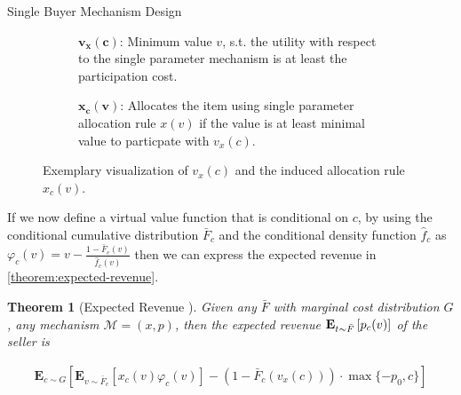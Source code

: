\documentclass[11pt,a4paper]{article}
\newtheorem{theorem}{Theorem}
\newcommand{\Ex}[2][]{\mbox{\rm\bf E}_{#1}\left[#2\right]}
\newcommand{\1}[1]{\mbox{\rm\bf 1}_{#1}}
\begin{document}
\begin{section}{Single Buyer Mechanism Design}
\begin{figure}[htp!]
\begin{subfigure}{.4\textwidth}
         \caption{
             $\mathbf{v_x(c)}$: Minimum value $v$, s.t. the utility with respect to the single parameter mechanism is at least the participation cost.
         }
     \end{subfigure}
     \begin{subfigure}{.4\textwidth}
         \centering
         \caption{
             $\mathbf{\mathbf{x_c(v)}}$: Allocates the item using single parameter allocation rule $x(v)$ if the value is at least minimal value to particpate with $v_x(c)$.
         }
     \end{subfigure}
     \caption{
         Exemplary visualization of $v_x(c)$ and the induced allocation rule $x_c(v)$.
     }
     \label{fig:visualization-of-induced-mechanism}
 \end{figure}

 If we now define a virtual value function that is conditional on $c$, by using the conditional cumulative distribution $\bar{F}_c$ and the conditional density function $\hat{f}_c$ as
 $\varphi_c(v) = v - \frac{1- \bar{F}_c(v)}{\hat{f}_c(v)}$ then we can express the expected revenue in \autoref{theorem:expected-revenue}.

 \begin{theorem}[Expected Revenue \cite{primary}]
     \label{theorem:expected-revenue}
     Given any $\bar{F}$ with marginal cost distribution $G$, any mechanism $\mathcal{M}=(x,p)$, then the expected revenue $\Ex[t \sim \bar{F}]{p_c(v)}$ of the seller is

     \begin{align*}
         \mathbf{E}_{c \sim G}\left[\mathbf{E}_{v\sim\bar{F}_c}\left[x_c(v)\varphi_c(v)\right] - (1-\bar{F}_c(v_x(c))) \cdot \max\{-p_0,c\}\right]
     \end{align*}
 \end{theorem}


\end{section}
\end{document}
